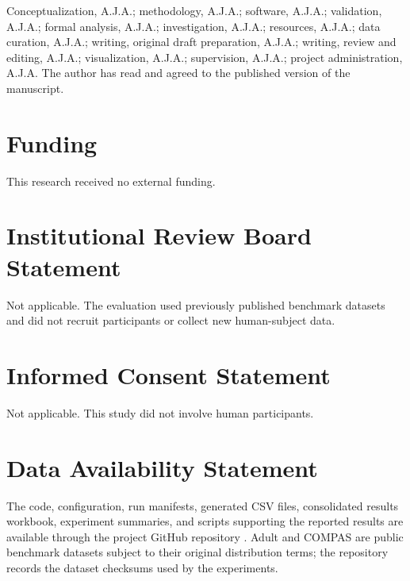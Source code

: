 \documentclass[futureinternet,article,submit,pdftex,moreauthors]{Definitions/mdpi}
\begin{document}
Conceptualization, A.J.A.; methodology, A.J.A.; software, A.J.A.; validation, A.J.A.; formal analysis, A.J.A.; investigation, A.J.A.; resources, A.J.A.; data curation, A.J.A.; writing, original draft preparation, A.J.A.; writing, review and editing, A.J.A.; visualization, A.J.A.; supervision, A.J.A.; project administration, A.J.A. The author has read and agreed to the published version of the manuscript.

\section*{Funding}

This research received no external funding.

\section*{Institutional Review Board Statement}

Not applicable. The evaluation used previously published benchmark datasets and did not recruit participants or collect new human-subject data.

\section*{Informed Consent Statement}

Not applicable. This study did not involve human participants.

\section*{Data Availability Statement}

The code, configuration, run manifests, generated CSV files, consolidated results workbook, experiment summaries, and scripts supporting the reported results are available through the project GitHub repository \cite{fairai_mvp_2026}. Adult and COMPAS are public benchmark datasets subject to their original distribution terms; the repository records the dataset checksums used by the experiments.

\end{document}
